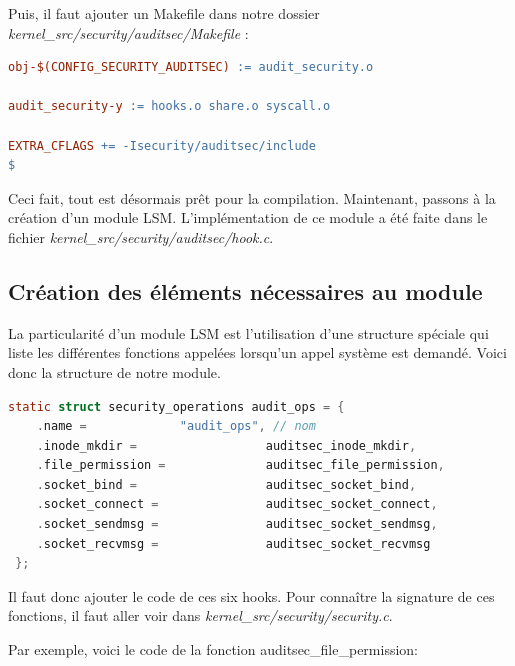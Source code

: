 \documentclass[pdftex,a4paper,titlepage,11pt]{article}
\begin{document}
Puis, il faut ajouter un Makefile dans notre dossier \textit{{kernel\_src}/security/auditsec/Makefile} :

\begin{lstlisting}[language=make]
obj-$(CONFIG_SECURITY_AUDITSEC) := audit_security.o
 
audit_security-y := hooks.o share.o syscall.o

EXTRA_CFLAGS += -Isecurity/auditsec/include
$\end{lstlisting}

Ceci fait, tout est désormais prêt pour la compilation. Maintenant, passons à la création d'un module LSM. L'implémentation de ce module a été faite dans le fichier \textit{{kernel\_src}/security/auditsec/hook.c}. 

\subsection{Création des éléments nécessaires au module}

La particularité d'un module LSM est l'utilisation d'une structure spéciale qui liste les différentes fonctions appelées lorsqu'un appel système est demandé. Voici donc la structure de notre module.

\begin{lstlisting}[language=C]
static struct security_operations audit_ops = {
	.name =             "audit_ops", // nom 
	.inode_mkdir =                  auditsec_inode_mkdir,
	.file_permission =              auditsec_file_permission,
	.socket_bind =                  auditsec_socket_bind,
	.socket_connect =               auditsec_socket_connect,
	.socket_sendmsg =               auditsec_socket_sendmsg,
 	.socket_recvmsg =               auditsec_socket_recvmsg
 };
\end{lstlisting}

Il faut donc ajouter le code de ces six hooks. Pour connaître la signature de ces fonctions, il faut aller voir dans \textit{{kernel\_src}/security/security.c}. 

Par exemple, voici le code de la fonction auditsec\_file\_permission:
\end{document}
